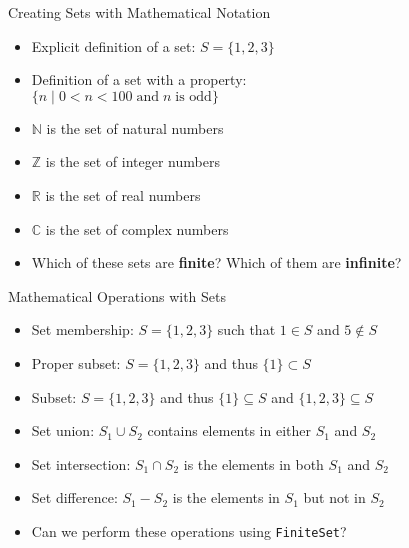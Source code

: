 \documentclass[14pt,aspectratio=169]{beamer}
\begin{document}
%
\begin{frame}{Creating Sets with Mathematical Notation}
  \begin{itemize}
    \item Explicit definition of a set: $S = \{1, 2, 3\}$
      \vspace*{-.15in}
    \item Definition of a set with a property:\\ $\{ n \; | \; 0 < n < 100
      \;\mbox{and}\; n \;\mbox{is odd} \}$
      \vspace*{-.15in}
    \item $\mathbb{N}$ is the set of natural numbers
      \vspace*{-.15in}
    \item $\mathbb{Z}$ is the set of integer numbers
      \vspace*{-.15in}
    \item $\mathbb{R}$ is the set of real numbers
      \vspace*{-.15in}
    \item $\mathbb{C}$ is the set of complex numbers
      \vspace*{-.15in}
    \item Which of these sets are {\bf finite}? Which of them are {\bf infinite}?
  \end{itemize}
\end{frame}

%
\begin{frame}{Mathematical Operations with Sets}
  \begin{itemize}
    \item Set membership: $S = \{1, 2, 3\}$ such that $1 \in S$ and $5 \notin S$
      \vspace*{-.15in}
    \item Proper subset: $S = \{1, 2, 3\}$ and thus $\{1\} \subset S$
      \vspace*{-.15in}
    \item Subset: $S = \{1, 2, 3\}$ and thus $\{1\} \subseteq S$ and $\{1, 2, 3\} \subseteq S$
      \vspace*{-.15in}
    \item Set union: $S_1 \cup S_2$ contains elements in either $S_1$ and $S_2$
      \vspace*{-.15in}
    \item Set intersection: $S_1 \cap S_2$ is the elements in both $S_1$ and $S_2$
      \vspace*{-.15in}
    \item Set difference: $S_1 - S_2$ is the elements in $S_1$ but not in $S_2$
      \vspace*{-.15in}
    \item Can we perform these operations using {\tt FiniteSet}?
  \end{itemize}
\end{frame}
\end{document}
